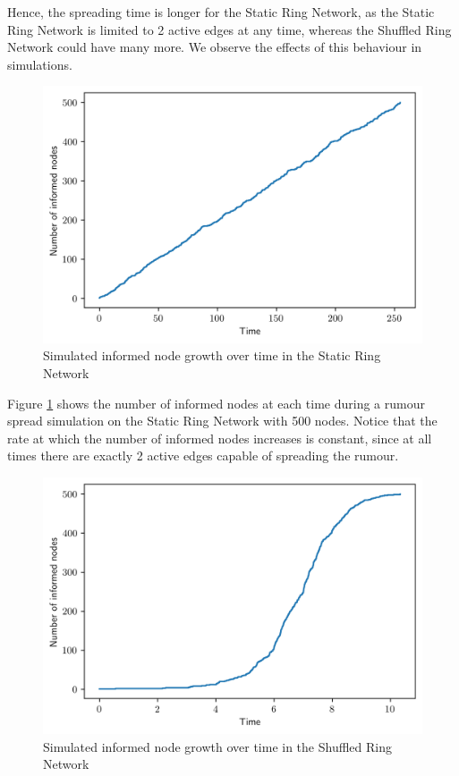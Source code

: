 Hence, the spreading time is longer for the Static Ring Network, as the Static Ring Network is limited to 2 active edges at any time, whereas the Shuffled Ring Network could have many more. We observe the effects of this behaviour in simulations.

\begin{figure}[h]
	\centering
	\includegraphics[width=\textwidth]{./figures/static_ring_informed_node_growth.png}
	\caption{Simulated informed node growth over time in the Static Ring Network}
	\label{fig:staticRingInformedNodeGrowth}
\end{figure}

Figure \ref{fig:staticRingInformedNodeGrowth} shows the number of informed nodes at each time during a rumour spread simulation on the Static Ring Network with 500 nodes. Notice that the rate at which the number of informed nodes increases is constant, since at all times there are exactly 2 active edges capable of spreading the rumour.

\begin{figure}[h]
	\centering
	\includegraphics[width=\textwidth]{./figures/shuffled_ring_informed_node_growth.png}
	\caption{Simulated informed node growth over time in the Shuffled Ring Network}
	\label{fig:shuffledRingInformedNodeGrowth}
\end{figure}

